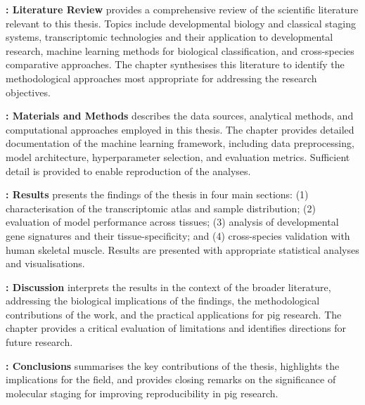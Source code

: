 \textbf{: Literature Review} provides a comprehensive review of the scientific literature relevant to this thesis. Topics include developmental biology and classical staging systems, transcriptomic technologies and their application to developmental research, machine learning methods for biological classification, and cross-species comparative approaches. The chapter synthesises this literature to identify the methodological approaches most appropriate for addressing the research objectives.

\textbf{: Materials and Methods} describes the data sources, analytical methods, and computational approaches employed in this thesis. The chapter provides detailed documentation of the machine learning framework, including data preprocessing, model architecture, hyperparameter selection, and evaluation metrics. Sufficient detail is provided to enable reproduction of the analyses.

\textbf{: Results} presents the findings of the thesis in four main sections: (1) characterisation of the transcriptomic atlas and sample distribution; (2) evaluation of model performance across tissues; (3) analysis of developmental gene signatures and their tissue-specificity; and (4) cross-species validation with human skeletal muscle. Results are presented with appropriate statistical analyses and visualisations.

\textbf{: Discussion} interprets the results in the context of the broader literature, addressing the biological implications of the findings, the methodological contributions of the work, and the practical applications for pig research. The chapter provides a critical evaluation of limitations and identifies directions for future research.

\textbf{: Conclusions} summarises the key contributions of the thesis, highlights the implications for the field, and provides closing remarks on the significance of molecular staging for improving reproducibility in pig research.
